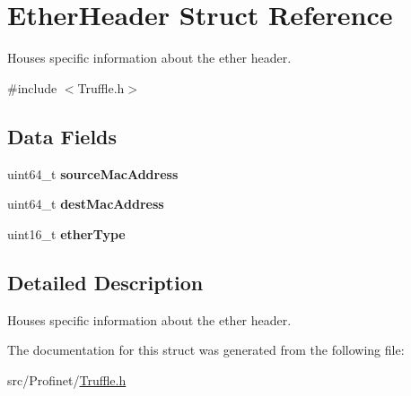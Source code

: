 \hypertarget{struct_ether_header}{\section{Ether\-Header Struct Reference}
\label{struct_ether_header}
}


Houses specific information about the ether header.  




{\ttfamily \#include $<$Truffle.\-h$>$}

\subsection*{Data Fields}
\begin{DoxyCompactItemize}
\item 
\hypertarget{struct_ether_header_ab4999641b26b615e3eea9394a116ed62}{uint64\-\_\-t {\bfseries source\-Mac\-Address}}\label{struct_ether_header_ab4999641b26b615e3eea9394a116ed62}

\item 
\hypertarget{struct_ether_header_ac71ed57be2c8e9841e36a41875893e78}{uint64\-\_\-t {\bfseries dest\-Mac\-Address}}\label{struct_ether_header_ac71ed57be2c8e9841e36a41875893e78}

\item 
\hypertarget{struct_ether_header_a6a0916fd23f851ba6cd2bcd3700123b2}{uint16\-\_\-t {\bfseries ether\-Type}}\label{struct_ether_header_a6a0916fd23f851ba6cd2bcd3700123b2}

\end{DoxyCompactItemize}


\subsection{Detailed Description}
Houses specific information about the ether header. 

The documentation for this struct was generated from the following file\-:\begin{DoxyCompactItemize}
\item 
src/\-Profinet/\hyperlink{_truffle_8h}{Truffle.\-h}\end{DoxyCompactItemize}
